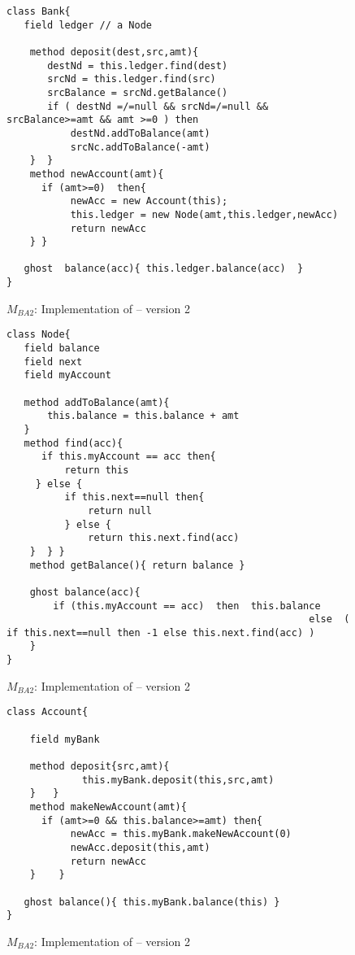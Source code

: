 \begin{figure}[htb]
\begin{lstlisting}
class Bank{
   field ledger // a Node
   
    method deposit(dest,src,amt){
       destNd = this.ledger.find(dest)
       srcNd = this.ledger.find(src)
       srcBalance = srcNd.getBalance()
       if ( destNd =/=null && srcNd=/=null && srcBalance>=amt && amt >=0 ) then
           destNd.addToBalance(amt)
           srcNc.addToBalance(-amt)           
    }  }     
    method newAccount(amt){
      if (amt>=0)  then{
           newAcc = new Account(this);
           this.ledger = new Node(amt,this.ledger,newAcc)
           return newAcc 
    } }
   
   ghost  balance(acc){ this.ledger.balance(acc)  } 
}
\end{lstlisting}
 \vspace*{-7mm}
\caption{$M_{BA2}$: Implementation of    -- version 2}
\label{fig:BanAccImplV2a}
\end{figure}

 
\begin{figure}[htb]
\begin{lstlisting}
class Node{
   field balance
   field next   
   field myAccount
   
   method addToBalance(amt){
       this.balance = this.balance + amt
   }   
   method find(acc){
      if this.myAccount == acc then{
          return this
     } else { 
          if this.next==null then{
              return null
          } else {
              return this.next.find(acc)
    }  } } 
    method getBalance(){ return balance }
    
    ghost balance(acc){
        if (this.myAccount == acc)  then  this.balance
                                                    else  ( if this.next==null then -1 else this.next.find(acc) )
    }
}          
\end{lstlisting}
 \vspace*{-7mm}
\caption{$M_{BA2}$: Implementation of    -- version 2}
\label{fig:BanAccImplV2a}
\end{figure}

\begin{figure}[htb]
\begin{lstlisting}
class Account{

    field myBank
    
    method deposit{src,amt){
             this.myBank.deposit(this,src,amt)
    }   }    
    method makeNewAccount(amt){
      if (amt>=0 && this.balance>=amt) then{
           newAcc = this.myBank.makeNewAccount(0)
           newAcc.deposit(this,amt)
           return newAcc
    }    }     

   ghost balance(){ this.myBank.balance(this) }   
}
\end{lstlisting}
 \vspace*{-7mm}
\caption{$M_{BA2}$: Implementation of   -- version 2}
\label{fig:BanAccImplV2b}
\end{figure}
 


